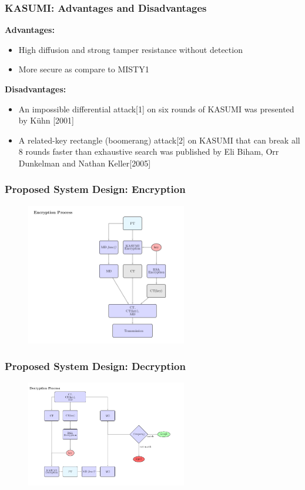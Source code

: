 \documentclass{beamer}
\begin{document}
\begin{frame}[t]
	\frametitle{KASUMI: Advantages and Disadvantages}
	\textbf{Advantages: }
	\begin{itemize}
		\item High diffusion and strong tamper resistance without detection
		\item More secure as compare to MISTY1
	\end{itemize}
\textbf{Disadvantages: }
\begin{itemize}
	\item An impossible differential attack[1] on six rounds of KASUMI was presented by Kühn [2001]
	\item A related-key rectangle (boomerang) attack[2] on KASUMI that can break all 8 rounds faster than exhaustive search was published by Eli Biham, Orr Dunkelman and Nathan Keller[2005]
\end{itemize}
\end{frame}

\begin{frame}
	\frametitle{Proposed System Design: Encryption}
	\begin{figure}[h]
		\includegraphics[width=7cm]{enc}
	\end{figure}
\end{frame}
	
\begin{frame}
	\frametitle{Proposed System Design: Decryption}
	\begin{figure}[h]
		\includegraphics[width=7cm]{dec}
	\end{figure}
	
\end{frame}
\end{document}
